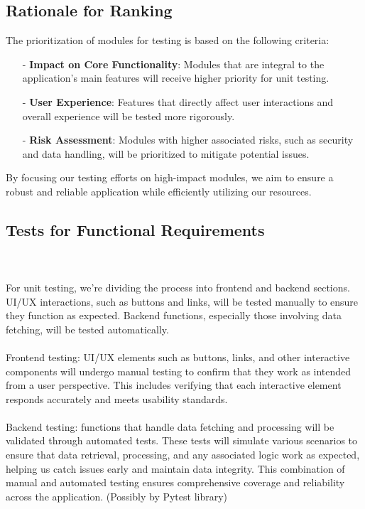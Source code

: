 \documentclass[12pt, titlepage]{article}
\begin{document}
\subsection{Rationale for Ranking}
The prioritization of modules for testing is based on the following criteria:
\begin{itemize}
    \item[-] \textbf{Impact on Core Functionality}: Modules that are integral to the application’s main features will receive higher priority for unit testing.
    \item[-] \textbf{User Experience}: Features that directly affect user interactions and overall experience will be tested more rigorously.
    \item[-] \textbf{Risk Assessment}: Modules with higher associated risks, such as security and data handling, will be prioritized to mitigate potential issues.
\end{itemize}

\noindent By focusing our testing efforts on high-impact modules, we aim to ensure a robust and reliable application while efficiently utilizing our resources.


\subsection{Tests for Functional Requirements}

\\\\
For unit testing, we’re dividing the process into frontend and backend sections. UI/UX interactions, such as buttons and links, will be tested manually to ensure they function as expected. Backend functions, especially those involving data fetching, will be tested automatically.\\\\
Frontend testing: UI/UX elements such as buttons, links, and other interactive components will undergo manual testing to confirm that they work as intended from a user perspective. This includes verifying that each interactive element responds accurately and meets usability standards.\\\\
Backend testing: functions that handle data fetching and processing will be validated through automated tests. These tests will simulate various scenarios to ensure that data retrieval, processing, and any associated logic work as expected, helping us catch issues early and maintain data integrity. This combination of manual and automated testing ensures comprehensive coverage and reliability across the application. (Possibly by Pytest library)
\end{document}
